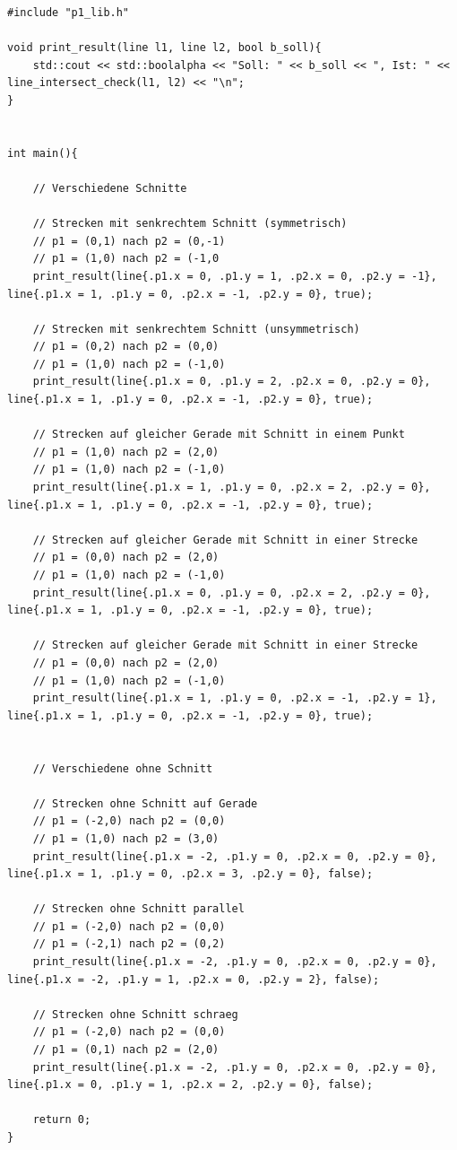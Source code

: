 \documentclass[12pt]{scrartcl}
\begin{document}
\begin{lstlisting}[style=CStyle, caption={testing.cpp: Testen der Bibliotheksfunktionen},captionpos=b]
#include "p1_lib.h"

void print_result(line l1, line l2, bool b_soll){
    std::cout << std::boolalpha << "Soll: " << b_soll << ", Ist: " << line_intersect_check(l1, l2) << "\n";
}


int main(){

    // Verschiedene Schnitte

    // Strecken mit senkrechtem Schnitt (symmetrisch)
    // p1 = (0,1) nach p2 = (0,-1)
    // p1 = (1,0) nach p2 = (-1,0
    print_result(line{.p1.x = 0, .p1.y = 1, .p2.x = 0, .p2.y = -1}, line{.p1.x = 1, .p1.y = 0, .p2.x = -1, .p2.y = 0}, true);

    // Strecken mit senkrechtem Schnitt (unsymmetrisch)
    // p1 = (0,2) nach p2 = (0,0)
    // p1 = (1,0) nach p2 = (-1,0)
    print_result(line{.p1.x = 0, .p1.y = 2, .p2.x = 0, .p2.y = 0}, line{.p1.x = 1, .p1.y = 0, .p2.x = -1, .p2.y = 0}, true);
    
    // Strecken auf gleicher Gerade mit Schnitt in einem Punkt
    // p1 = (1,0) nach p2 = (2,0)
    // p1 = (1,0) nach p2 = (-1,0)
    print_result(line{.p1.x = 1, .p1.y = 0, .p2.x = 2, .p2.y = 0}, line{.p1.x = 1, .p1.y = 0, .p2.x = -1, .p2.y = 0}, true);

    // Strecken auf gleicher Gerade mit Schnitt in einer Strecke
    // p1 = (0,0) nach p2 = (2,0)
    // p1 = (1,0) nach p2 = (-1,0)
    print_result(line{.p1.x = 0, .p1.y = 0, .p2.x = 2, .p2.y = 0}, line{.p1.x = 1, .p1.y = 0, .p2.x = -1, .p2.y = 0}, true);

    // Strecken auf gleicher Gerade mit Schnitt in einer Strecke
    // p1 = (0,0) nach p2 = (2,0)
    // p1 = (1,0) nach p2 = (-1,0)
    print_result(line{.p1.x = 1, .p1.y = 0, .p2.x = -1, .p2.y = 1}, line{.p1.x = 1, .p1.y = 0, .p2.x = -1, .p2.y = 0}, true);


    // Verschiedene ohne Schnitt

    // Strecken ohne Schnitt auf Gerade
    // p1 = (-2,0) nach p2 = (0,0)
    // p1 = (1,0) nach p2 = (3,0)
    print_result(line{.p1.x = -2, .p1.y = 0, .p2.x = 0, .p2.y = 0}, line{.p1.x = 1, .p1.y = 0, .p2.x = 3, .p2.y = 0}, false);

    // Strecken ohne Schnitt parallel
    // p1 = (-2,0) nach p2 = (0,0)
    // p1 = (-2,1) nach p2 = (0,2)
    print_result(line{.p1.x = -2, .p1.y = 0, .p2.x = 0, .p2.y = 0}, line{.p1.x = -2, .p1.y = 1, .p2.x = 0, .p2.y = 2}, false);

    // Strecken ohne Schnitt schraeg
    // p1 = (-2,0) nach p2 = (0,0)
    // p1 = (0,1) nach p2 = (2,0)
    print_result(line{.p1.x = -2, .p1.y = 0, .p2.x = 0, .p2.y = 0}, line{.p1.x = 0, .p1.y = 1, .p2.x = 2, .p2.y = 0}, false);

    return 0;
}
\end{lstlisting}
\end{document}
